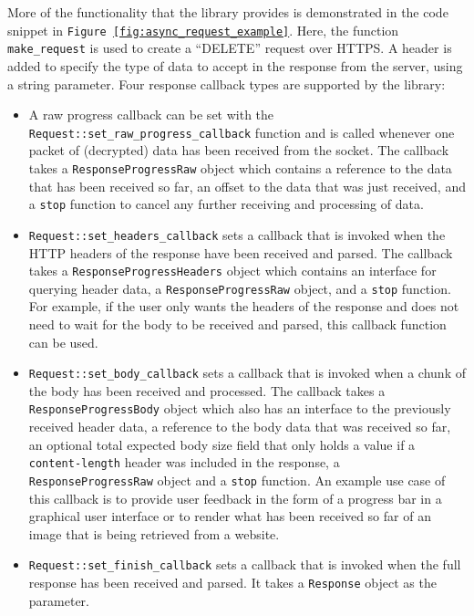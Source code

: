 \documentclass[12pt, a4paper]{article}
\begin{document}
More of the functionality that the library provides is demonstrated in the code snippet in \texttt{Figure \ref{fig:async_request_example}}. Here, the function \texttt{make\_request} is used to create a “DELETE” request over HTTPS. A header is added to specify the type of data to accept in the response from the server, using a string parameter. Four response callback types are supported by the library:
\begin{itemize}
	\item A raw progress callback can be set with the \texttt{Request::set\_raw\_progress\_callback} function and is called whenever one packet of (decrypted) data has been received from the socket. The callback takes a \texttt{ResponseProgressRaw} object which contains a reference to the data that has been received so far, an offset to the data that was just received, and a \texttt{stop} function to cancel any further receiving and processing of data.
	\item \texttt{Request::set\_headers\_callback} sets a callback that is invoked when the HTTP headers of the response have been received and parsed. The callback takes a \texttt{ResponseProgressHeaders} object which contains an interface for querying header data, a \texttt{ResponseProgressRaw} object, and a \texttt{stop} function. For example, if the user only wants the headers of the response and does not need to wait for the body to be received and parsed, this callback function can be used.
	\item \texttt{Request::set\_body\_callback} sets a callback that is invoked when a chunk of the body has been received and processed. The callback takes a \texttt{ResponseProgressBody} object which also has an interface to the previously received header data, a reference to the body data that was received so far, an optional total expected body size field that only holds a value if a \texttt{content-length} header was included in the response, a \texttt{ResponseProgressRaw} object and a \texttt{stop} function. An example use case of this callback is to provide user feedback in the form of a progress bar in a graphical user interface or to render what has been received so far of an image that is being retrieved from a website.
	\item \texttt{Request::set\_finish\_callback} sets a callback that is invoked when the full response has been received and parsed. It takes a \texttt{Response} object as the parameter.
\end{itemize}
\end{document}
